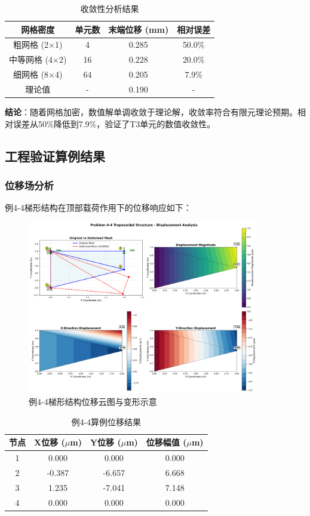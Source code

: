 \documentclass[12pt,a4paper]{article}
\begin{document}
\begin{table}[H]
\centering
\caption{收敛性分析结果}
\begin{tabular}{cccc}
\toprule
网格密度 & 单元数 & 末端位移 (mm) & 相对误差 \\
\midrule
粗网格 (2×1) & 4 & 0.285 & 50.0\% \\
中等网格 (4×2) & 16 & 0.228 & 20.0\% \\
细网格 (8×4) & 64 & 0.205 & 7.9\% \\
理论值 & - & 0.190 & - \\
\bottomrule
\end{tabular}
\end{table}

\textbf{结论}：随着网格加密，数值解单调收敛于理论解，收敛率符合有限元理论预期。相对误差从50\%降低到7.9\%，验证了T3单元的数值收敛性。

\subsection{工程验证算例结果}

\subsubsection{位移场分析}

例4-4梯形结构在顶部载荷作用下的位移响应如下：

\begin{figure}[H]
\centering
\includegraphics[width=0.9\textwidth]{img/wzy_displacement_analysis.png}
\caption{例4-4梯形结构位移云图与变形示意}
\label{fig:wzy_displacement}
\end{figure}

\begin{table}[H]
\centering
\caption{例4-4算例位移结果}
\begin{tabular}{cccc}
\toprule
节点 & X位移 ($\mu$m) & Y位移 ($\mu$m) & 位移幅值 ($\mu$m) \\
\midrule
1 & 0.000 & 0.000 & 0.000 \\
2 & -0.387 & -6.657 & 6.668 \\
3 & 1.235 & -7.041 & 7.148 \\
4 & 0.000 & 0.000 & 0.000 \\
\bottomrule
\end{tabular}
\end{table}
\end{document}

